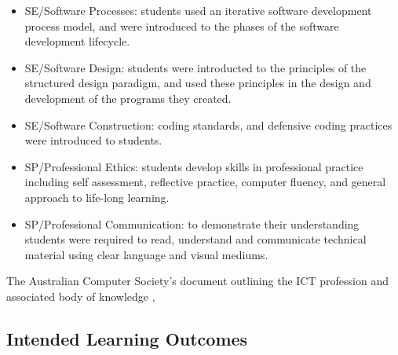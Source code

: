 \begin{itemize}[noitemsep,nolistsep]
	\item SE/Software Processes: students used an iterative software development process model, and were introduced to the phases of the software development lifecycle. 
	\item SE/Software Design: students were introducted to the principles of the structured design paradigm, and used these principles in the design and development of the programs they created.
	\item SE/Software Construction: coding standards, and defensive coding practices were introduced to students.
	\item SP/Professional Ethics: students develop skills in professional practice including self assessment, reflective practice, computer fluency, and general approach to life-long learning.
	\item SP/Professional Communication: to demonstrate their understanding students were required to read, understand and communicate technical material using clear language and visual mediums.
\end{itemize}

The Australian Computer Society's document outlining the ICT profession and associated body of knowledge \cite{Gregor:2008}, 


\subsection{Intended Learning Outcomes} %
\label{sec:intro:intended_learning_outcomes}



